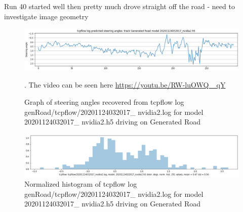 Run 40 started well then pretty much drove straight off the road - need to investigate image
geometry
\begin{figure}[ht]
 \centering 
 \includegraphics[width=\textwidth]{Figures/tcpflow_20201124032017_nvidia2_graph.png}
 \caption{Graph of steering angles recovered from tcpflow log genRoad/tcpflow/20201124032017\_ nvidia2.log for model 20201124032017\_ nvidia2.h5 driving on Generated Road}. The video can be seen here \href{https://youtu.be/RW-luOWQ\_ qY}{https://youtu.be/RW-luOWQ\_ qY}
 \label{fig:tcpflow_20201124032017_nvidia2_graph}
\end{figure}

\begin{figure}[ht]
 \centering 
 \includegraphics[width=\textwidth]{Figures/tcpflow_20201124032017_nvidia2_bins.png}
 \caption{Normalized histogram of tcpflow log genRoad/tcpflow/20201124032017\_ nvidia2.log for model 20201124032017\_ nvidia2.h5 driving on Generated Road}
 \label{fig:tcpflow_20201124032017_nvidia2_bins} 
\end{figure} 


